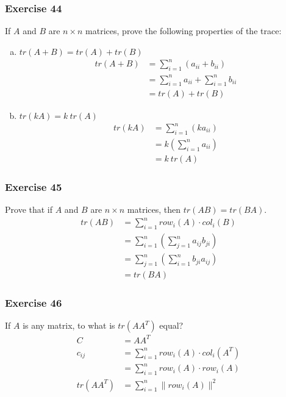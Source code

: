 \documentclass{math}
\begin{document}
\subsubsection*{Exercise 44}
If \( A \) and \( B \) are \( n\times n \) matrices, prove the following
properties of the trace:
\begin{enumerate}[(a)]
  \item \( tr(A+B) = tr(A)+tr(B) \)
  \begin{align*}
    tr(A+B) &= \sum_{i=1}^{n}(a_{ii}+b_{ii}) \\
    &= \sum_{i=1}^{n}a_{ii}+\sum_{i=1}^{n}b_{ii} \\
    &= tr(A)+tr(B)
  \end{align*}
  \item \( tr(kA) = k~tr(A) \)
  \begin{align*}
    tr(kA) &= \sum_{i=1}^{n}(ka_{ii}) \\
    &= k\left(\sum_{i=1}^{n}a_{ii}\right) \\
    &= k~tr(A)
  \end{align*}
\end{enumerate}

\subsubsection*{Exercise 45}
Prove that if \( A \) and \( B \) are \( n\times n \) matrices, then \( tr(AB)
= tr(BA) \).
\begin{align*}
  tr(AB) &= \sum_{i=1}^{n}row_i(A)\cdot col_i(B) \\
  &= \sum_{i=1}^{n}\left(\sum_{j=1}^{n}a_{ij}b_{ji}\right) \\
  &= \sum_{j=1}^{n}\left(\sum_{i=1}^{n}b_{ji}a_{ij}\right) \\
  &= tr(BA)
\end{align*}

\subsubsection*{Exercise 46}
If \( A \) is any matrix, to what is \( tr(AA^T) \) equal?
\begin{align*}
  C &= AA^T \\
  c_{ij} &= \sum_{i=1}^{n}row_i(A)\cdot col_i(A^T) \\
  &= \sum_{i=1}^{n}row_i(A)\cdot row_i(A) \\
  tr(AA^T) &= \sum_{i=1}^{n}\|row_i(A)\|^2
\end{align*}
\end{document}
